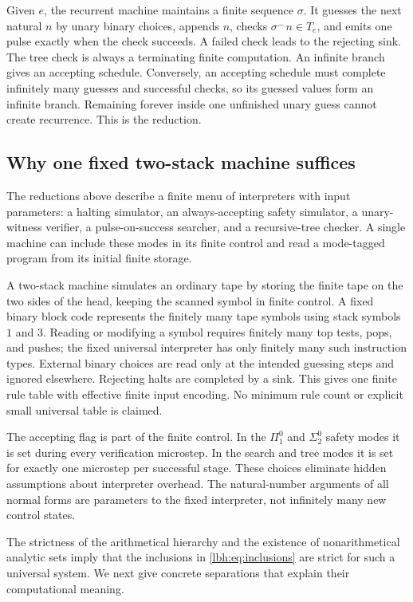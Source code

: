 \documentclass[11pt,letterpaper]{article}
\theoremstyle{definition}
\theoremstyle{remark}
\newcommand{\sig}[1]{\Sigma^{0}_{#1}}
\newcommand{\ppi}[1]{\Pi^{0}_{#1}}
\newcommand{\1}{\mathbf 1}
\begin{document}
Given $e$, the recurrent machine maintains a finite sequence $\sigma$.
It guesses the next natural $n$ by unary binary choices, appends $n$, checks
$\sigma^\frown n\in T_e$, and emits one pulse exactly when the check
succeeds. A failed check leads to the rejecting sink. The tree check is
always a terminating finite computation. An infinite branch gives an
accepting schedule. Conversely, an accepting schedule must complete
infinitely many guesses and successful checks, so its guessed values form
an infinite branch. Remaining forever inside one unfinished unary guess
cannot create recurrence. This is the reduction.

\subsection{Why one fixed two-stack machine suffices}\label{lbh:sec:universal}
The reductions above describe a finite menu of interpreters with input
parameters: a halting simulator, an always-accepting safety simulator,
a unary-witness verifier, a pulse-on-success searcher, and a recursive-tree
checker. A single machine can include these modes in its finite control and
read a mode-tagged program from its initial finite storage.

A two-stack machine simulates an ordinary tape by storing the finite tape
on the two sides of the head, keeping the scanned symbol in finite control.
A fixed binary block code represents the finitely many tape symbols using
stack symbols $1$ and $3$. Reading or modifying a symbol requires finitely
many top tests, pops, and pushes; the fixed universal interpreter has only
finitely many such instruction types. External binary choices are read only
at the intended guessing steps and ignored elsewhere. Rejecting halts are
completed by a sink. This gives one finite rule table with effective finite
input encoding. No minimum rule count or explicit small universal table is
claimed.

The accepting flag is part of the finite control. In the $\ppi1$ and $\sig2$
safety modes it is set during every verification microstep. In the search
and tree modes it is set for exactly one microstep per successful stage.
These choices eliminate hidden assumptions about interpreter overhead.
The natural-number arguments of all normal forms are parameters to the
fixed interpreter, not infinitely many new control states.

The strictness of the arithmetical hierarchy and the existence of
nonarithmetical analytic sets imply that the inclusions in
\cref{lbh:eq:inclusions} are strict for such a universal system. We next give
concrete separations that explain their computational meaning.
\end{document}
